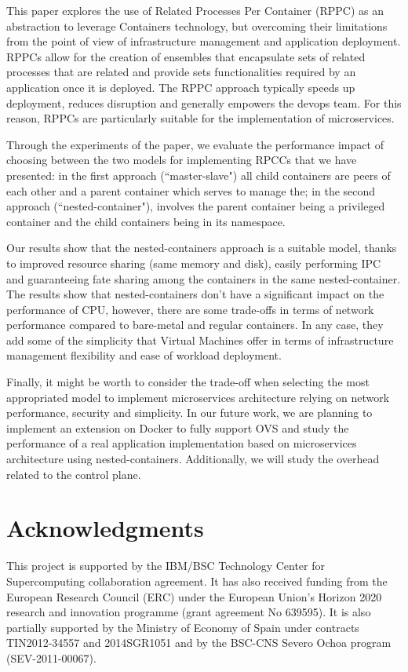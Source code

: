 \documentclass[conference]{IEEEtran}
\begin{document}
This paper explores the use of Related Processes Per Container (RPPC) as an
abstraction to leverage Containers technology, but overcoming their limitations
from the point of view of infrastructure management and application deployment.
RPPCs allow for the creation of ensembles that encapsulate sets of related
processes that are related and provide sets functionalities required by an
application once it is deployed. The RPPC approach typically speeds up
deployment, reduces disruption and generally empowers the devops team.
For this reason, RPPCs are particularly suitable for the implementation of
microservices.

Through the experiments of the paper, we evaluate the performance impact of
choosing between the two models for implementing RPCCs that we have presented:
in the first approach (``master-slave") all child containers are peers of each
other and a parent container which serves to manage the; 
in the second approach (``nested-container"), involves the parent
container being a privileged container and the child containers being in its 
namespace.

Our results show that the nested-containers approach is a
suitable model, thanks to improved resource sharing (same memory and disk),
easily performing IPC and guaranteeing fate sharing among the containers in
the same nested-container. The results show that nested-containers don't have
a significant impact on the performance of CPU, however, there are some
trade-offs in terms of network performance compared to bare-metal and regular
containers. In any case, they add some of the simplicity that Virtual Machines
offer in terms of infrastructure management flexibility and ease of
workload deployment.

Finally, it might be worth to consider the trade-off when selecting the most
appropriated model to implement microservices architecture relying on network
performance, security and simplicity. In our future work, we are planning to
implement an extension on Docker to fully support OVS and study the performance of a real
application implementation based on microservices architecture using
nested-containers.  Additionally, we will study the overhead related to the
control plane.


\section{Acknowledgments}
{\small This project is supported by the IBM/BSC Technology Center for Supercomputing collaboration
agreement. It has also received funding from the European Research Council (ERC) under the European Union's Horizon 2020 research and innovation programme (grant agreement No 639595). It is also partially supported by the Ministry of Economy of Spain under contracts TIN2012-34557 and 2014SGR1051 and by the BSC-CNS Severo Ochoa program (SEV-2011-00067).}




\end{document}
